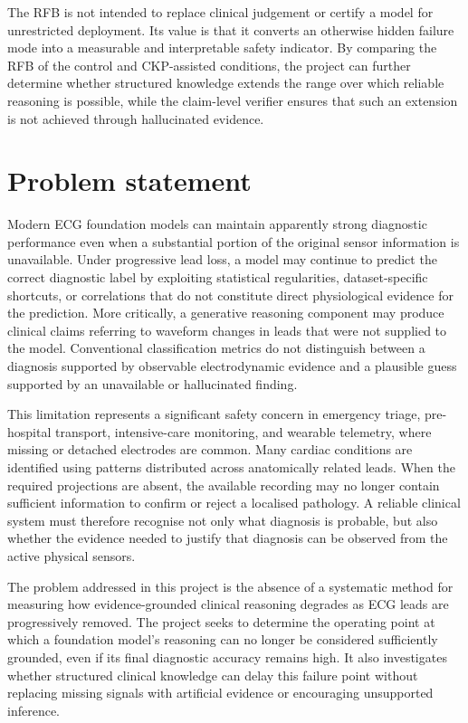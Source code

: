 \documentclass{ssnreview}
\begin{document}
The RFB is not intended to replace clinical judgement or certify a model for unrestricted
deployment. Its value is that it converts an otherwise hidden failure mode into a measurable
and interpretable safety indicator. By comparing the RFB of the control and CKP-assisted
conditions, the project can further determine whether structured knowledge extends the
range over which reliable reasoning is possible, while the claim-level verifier ensures that
such an extension is not achieved through hallucinated evidence.


\chapter{Problem statement}

Modern ECG foundation models can maintain apparently strong diagnostic performance even
when a substantial portion of the original sensor information is unavailable. Under
progressive lead loss, a model may continue to predict the correct diagnostic label by
exploiting statistical regularities, dataset-specific shortcuts, or correlations that do not
constitute direct physiological evidence for the prediction. More critically, a generative
reasoning component may produce clinical claims referring to waveform changes in leads
that were not supplied to the model. Conventional classification metrics do not distinguish
between a diagnosis supported by observable electrodynamic evidence and a plausible guess
supported by an unavailable or hallucinated finding.

This limitation represents a significant safety concern in emergency triage, pre-hospital
transport, intensive-care monitoring, and wearable telemetry, where missing or detached
electrodes are common. Many cardiac conditions are identified using patterns distributed
across anatomically related leads. When the required projections are absent, the available
recording may no longer contain sufficient information to confirm or reject a localised
pathology. A reliable clinical system must therefore recognise not only what diagnosis is
probable, but also whether the evidence needed to justify that diagnosis can be observed
from the active physical sensors.

The problem addressed in this project is the absence of a systematic method for measuring
how evidence-grounded clinical reasoning degrades as ECG leads are progressively removed.
The project seeks to determine the operating point at which a foundation model's reasoning
can no longer be considered sufficiently grounded, even if its final diagnostic accuracy
remains high. It also investigates whether structured clinical knowledge can delay this
failure point without replacing missing signals with artificial evidence or encouraging
unsupported inference.
\end{document}
